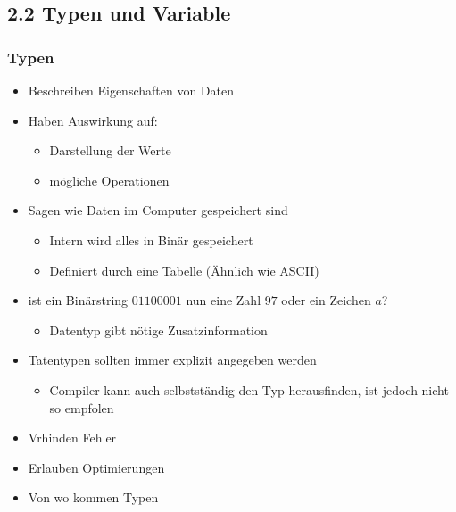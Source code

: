 \documentclass[11pt]{article}
\begin{document}
\subsection{2.2 Typen und Variable}
\label{sec:org5770744}
\subsubsection{Typen}
\label{sec:orgc4dfdd5}
\begin{itemize}
\item Beschreiben Eigenschaften von Daten\\
\item Haben Auswirkung auf:\\
\begin{itemize}
\item Darstellung der Werte\\
\item mögliche Operationen\\
\end{itemize}
\item Sagen wie Daten im Computer gespeichert sind\\
\begin{itemize}
\item Intern wird alles in Binär gespeichert\\
\item Definiert durch eine Tabelle (Ähnlich wie ASCII)\\
\end{itemize}
\item ist ein Binärstring \(01100001\) nun eine Zahl \(97\) oder ein Zeichen \(a\)?\\
\begin{itemize}
\item Datentyp gibt nötige Zusatzinformation\\
\end{itemize}
\item Tatentypen sollten immer explizit angegeben werden\\
\begin{itemize}
\item Compiler kann auch selbstständig den Typ herausfinden, ist jedoch nicht so empfolen\\
\end{itemize}
\item Vrhinden Fehler\\
\item Erlauben Optimierungen\\
\item Von wo kommen Typen\\

\end{itemize}
\end{document}
